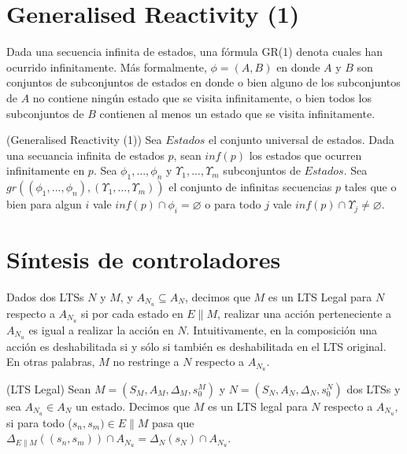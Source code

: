 \section{Generalised Reactivity (1)}

Dada una secuencia infinita de estados, una fórmula GR(1) \cite{SRD} denota cuales han ocurrido infinitamente. 
Más formalmente, $\phi = (A, B)$ en donde $A$ y $B$ son conjuntos de subconjuntos de estados en donde o bien alguno de los 
subconjuntos de $A$ no contiene ningún estado que se visita infinitamente, o bien todos los subconjuntos de $B$ contienen 
al menos un estado que se visita infinitamente.

\begin{definition}{(Generalised Reactivity (1))}
Sea $Estados$ el conjunto universal de estados. Dada una secuancia infinita de estados $p$, sean $inf(p)$ los estados que 
ocurren infinitamente en $p$. Sea $\phi_{1}, ..., \phi_{n}$ y $\varUpsilon_{1}, ..., \varUpsilon_{m}$ subconjuntos de $Estados$. Sea\\ 
$gr((\phi_{1}, ..., \phi_{n}), (\varUpsilon_{1}, ..., \varUpsilon_{m}))$ el conjunto de infinitas secuencias $p$ tales que 
o bien para algun $i$ vale $inf(p)\cap\phi_{i} = \varnothing$ o para todo $j$ vale $inf(p)\cap\varUpsilon_{j} \neq \varnothing$.
\end{definition}

\section{Síntesis de controladores}

Dados dos LTSs $N$ y $M$, y $A_{N_{u}} \subseteq A_{N}$, decimos que $M$ es un 
LTS Legal para $N$ respecto a $A_{N_{u}}$ si por cada 
estado en $E\parallel$$M$, realizar una acción perteneciente a $A_{N_{u}}$ es 
igual a realizar la acción en $N$. 
Intuitivamente, en la composición una acción es deshabilitada si y sólo si 
también es deshabilitada en el LTS original. 
En otras palabras, $M$ no restringe a $N$ respecto a $A_{N_{u}}$.

\begin{definition}{(LTS Legal)}
Sean $M = (S_{M}, A_{M}, \Delta_{M}, s_{0}^{M})$ y $N = (S_{N}, A_{N}, 
\Delta_{N}, s_{0}^{N})$ dos LTSs y sea $A_{N_{u}} \in A_{N}$ un estado. 
Decimos que $M$ es un LTS legal para $N$ respecto a $A_{N_{u}}$, si para todo 
($s_{n}, s_{m}) \in E \parallel M$ pasa que 
$\Delta_{E \parallel M}((s_{n}, s_{m})) \cap A_{N_{u}} = \Delta_{N}(s_{N}) \cap 
A_{N_{u}}$.
\end{definition}



